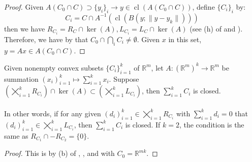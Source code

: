 \begin{proof}
	Given $A(C_0\cap C)\supset\{y_i\}_{i}\to y\in \operatorname{cl}(A(C_0\cap C))$, define $\{C_i\}_i$ by:
	\[
		C_i=C\cap A^{-1}\left(\operatorname{cl}\left(B(y;\|y-y_k\|) \right)\right)
	\]
	then we have $R_{C_i}=R_C\cap \operatorname{ker}(A),L_{C_i}=L_C\cap \operatorname{ker}(A)$ (see (h) of  and ). Therefore, we have by  that $C_0\cap \bigcap_iC_i\neq\emptyset$. Given $x$ in this set, $y=Ax\in A(C_0\cap C)$.
\end{proof}

\begin{coro}\label{coro:014-closed-sum}
	Given nonempty convex subsets $\{C_i\}_{i=1}^k$ of $\mathbb{R}^m$, let $A:(\mathbb{R}^{m})^k\to \mathbb{R}^m$ be summation $(x_i)_{i=1}^k\mapsto \sum_{i=1}^kx_i$. Suppose $\left(\bigtimes_{i=1}^kR_{C_i}\right)\cap\operatorname{ker}(A)\subset \left(\bigtimes_{i=1}^kL_{C_i}\right)$, then $\sum_{i=1}^kC_i$ is closed.
\end{coro}

\paragraph{}In other words, if for any given $(d_i)_{i=1}^k\in\bigtimes_{i=1}^kR_{C_i}$ with $\sum_{i=1}^kd_i=0$ that $(d_i)_{i=1}^k\in\bigtimes_{i=1}^kL_{C_i}$, then $\sum_{i=1}^kC_i$ is closed. If $k=2$, the condition is the same as $R_{C_1}\cap -R_{C_2}=\{0\}$.

\begin{proof}
	This is by (b) of , , and  with $C_0=\mathbb{R}^{mk}$.
\end{proof}

